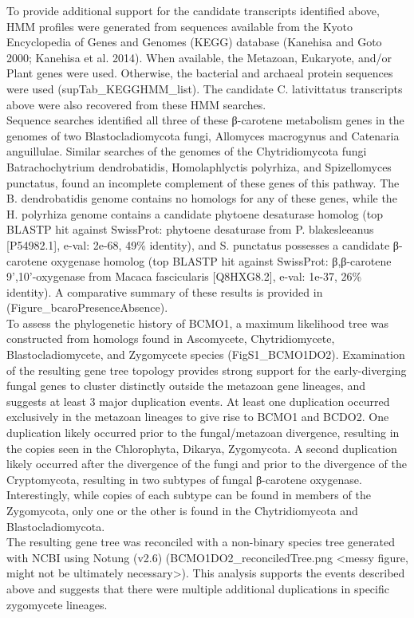 \indent To provide additional support for the candidate transcripts identified above, HMM profiles were generated from sequences available from the Kyoto Encyclopedia of Genes and Genomes (KEGG) database (Kanehisa and Goto 2000; Kanehisa et al. 2014). When available, the Metazoan, Eukaryote, and/or Plant genes were used. Otherwise, the bacterial and archaeal protein sequences were used (supTab\_KEGGHMM\_list). The candidate C. lativittatus transcripts above were also recovered from these HMM searches. \\
\indent Sequence searches identified all three of these β-carotene metabolism genes in the genomes of two Blastocladiomycota fungi, Allomyces macrogynus and Catenaria anguillulae. Similar searches of the genomes of the Chytridiomycota fungi Batrachochytrium dendrobatidis, Homolaphlyctis polyrhiza, and Spizellomyces punctatus, found an incomplete complement of these genes of this pathway. The B. dendrobatidis genome contains no homologs for any of these genes, while the H. polyrhiza genome contains a candidate phytoene desaturase homolog (top BLASTP hit against SwissProt: phytoene desaturase from P. blakesleeanus [P54982.1], e-val: 2e-68, 49\% identity), and S. punctatus possesses a candidate β-carotene oxygenase homolog (top BLASTP hit against SwissProt: β,β-carotene 9’,10’-oxygenase from Macaca fascicularis [Q8HXG8.2], e-val: 1e-37, 26\% identity). A comparative summary of these results is provided in (Figure\_bcaroPresenceAbsence). \\
\indent To assess the phylogenetic history of BCMO1, a maximum likelihood tree was constructed from homologs found in Ascomycete, Chytridiomycete, Blastocladiomycete, and Zygomycete species (FigS1\_BCMO1DO2). Examination of the resulting gene tree topology provides strong support for the early-diverging fungal genes to cluster distinctly outside the metazoan gene lineages, and suggests at least 3 major duplication events. At least one duplication occurred exclusively in the metazoan lineages to give rise to BCMO1 and BCDO2. One duplication likely occurred prior to the fungal/metazoan divergence, resulting in the copies seen in the Chlorophyta, Dikarya, Zygomycota. A second duplication likely occurred after the divergence of the fungi and prior to the divergence of the Cryptomycota, resulting in two subtypes of fungal β-carotene oxygenase. Interestingly, while copies of each subtype can be found in members of the Zygomycota, only one or the other is found in the Chytridiomycota and Blastocladiomycota.\\
\indent The resulting gene tree was reconciled with a non-binary species tree generated with NCBI using Notung (v2.6) (BCMO1DO2\_reconciledTree.png <messy figure, might not be ultimately necessary>). This analysis supports the events described above and suggests that there were multiple additional duplications in specific zygomycete lineages. \\
